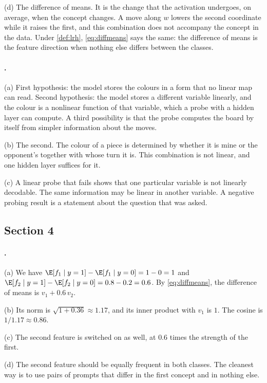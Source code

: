 {(d) The difference of means. It is the change that the activation undergoes, on average, when the concept changes.
A move along $w$ lowers the second coordinate while it raises the first, and this combination does not accompany
the concept in the data. Under \cref{def:lrh}, \eqref{eq:diffmeans} says the same: the difference of means is the
feature direction when nothing else differs between the classes.

\paragraph{.}
(a) First hypothesis: the model stores the colours in a form that no linear map can read. Second hypothesis: the
model stores a different variable linearly, and the colour is a nonlinear function of that variable, which a
probe with a hidden layer can compute. A third possibility is that the probe computes the board by itself from
simpler information about the moves.

(b) The second. The colour of a piece is determined by whether it is mine or the opponent's together with whose
turn it is. This combination is not linear, and one hidden layer suffices for it.

(c) A linear probe that fails shows that one particular variable is not linearly decodable. The same information
may be linear in another variable. A negative probing result is a statement about the question that was asked.

\subsection*{Section 4}

\paragraph{.}
(a) We have $\E[f_1\mid y=1]-\E[f_1\mid y=0]=1-0=1$ and $\E[f_2\mid y=1]-\E[f_2\mid y=0]=0.8-0.2=0.6$. By
\eqref{eq:diffmeans}, the difference of means is $v_1+0.6\,v_2$.

(b) Its norm is $\sqrt{1+0.36}\approx1.17$, and its inner product with $v_1$ is $1$. The cosine is
$1/1.17\approx0.86$.

(c) The second feature is switched on as well, at $0.6$ times the strength of the first.

(d) The second feature should be equally frequent in both classes. The cleanest way is to use pairs of prompts
that differ in the first concept and in nothing else.

}

